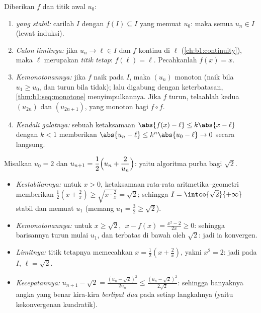 \begin{method}[Menelaah $u_{n+1} = f(u_n)$]\label{met:b1:seq:recurrent}
Diberikan $f$ dan titik awal $u_0$:
\begin{enumerate}
  \item \emph{ yang stabil:} carilah  $I$ dengan $f(I)
        \subseteq I$ yang memuat $u_0$: maka semua $u_n \in I$ (lewat
        induksi).
  \item \emph{Calon limitnya:} jika $u_n \to \ell \in I$ dan $f$
        kontinu di $\ell$ (\cref{ch:b1:continuity}), maka $\ell$
        merupakan \emph{titik tetap}: $f(\ell) = \ell$. Pecahkanlah $f(x) = x$.
  \item \emph{Kemonotonannya:} jika $f$ naik pada $I$, maka
        $(u_n)$ monoton (naik bila $u_1 \geq u_0$, dan
        turun bila tidak); lalu digabung dengan keterbatasan,
        \cref{thm:b1:seq:monotone} menyimpulkannya. Jika $f$ turun,
        telaahlah kedua  $(u_{2n})$ dan $(u_{2n+1})$,
        yang monoton bagi $f \circ f$.
  \item \emph{Kendali galatnya:} sebuah ketaksamaan $\abs{f(x) - \ell} \leq
        k\abs{x - \ell}$ dengan $k < 1$ memberikan $\abs{u_n - \ell} \leq
        k^n \abs{u_0 - \ell} \to 0$ secara langsung.
\end{enumerate}
\end{method}

\begin{example}\label{ex:b1:seq:heron}
Misalkan $u_0 = 2$ dan $u_{n+1} = \dfrac12\Bigl(u_n +
\dfrac{2}{u_n}\Bigr)$: yaitu algoritma purba bagi
$\sqrt 2$.
\begin{itemize}
  \item \emph{Kestabilannya:} untuk $x > 0$, ketaksamaan rata-rata
        aritmetika--geometri memberikan $\frac12(x + \frac2x) \geq \sqrt{x \cdot
        \frac 2x} = \sqrt 2$; sehingga $I = \intco{\sqrt 2}{+\infty}$
        stabil dan memuat $u_1$ (memang $u_1 = \frac32 \geq
        \sqrt 2$).
  \item \emph{Kemonotonannya:} untuk $x \geq \sqrt 2$, $\;x - f(x) =
        \frac{x^2 - 2}{2x} \geq 0$: sehingga barisannya turun mulai
        $u_1$, dan terbatas di bawah oleh $\sqrt 2$: jadi ia konvergen.
  \item \emph{Limitnya:} titik tetapnya memecahkan $x = \frac12(x +
        \frac2x)$, yakni $x^2 = 2$: jadi pada $I$, $\ell = \sqrt 2$.
  \item \emph{Kecepatannya:} $u_{n+1} - \sqrt 2 = \frac{(u_n -
        \sqrt2)^2}{2u_n} \leq \frac{(u_n - \sqrt 2)^2}{2\sqrt 2}$:
        sehingga banyaknya angka yang benar kira-kira \emph{berlipat dua} pada setiap
        langkahnya (yaitu kekonvergenan kuadratik).
\end{itemize}
\end{example}

